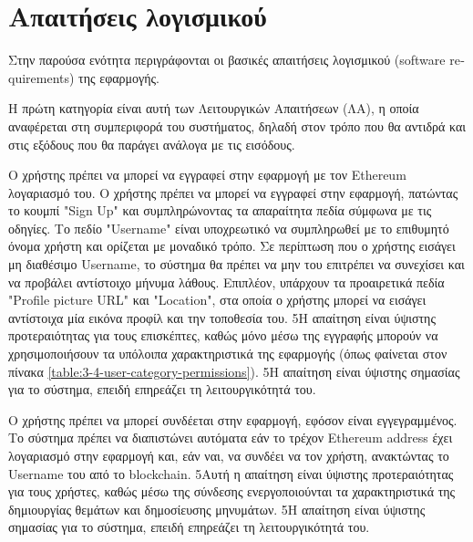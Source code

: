 \section{Απαιτήσεις λογισμικού} \label{section:3-5-software-requirements}

Στην παρούσα ενότητα περιγράφονται οι βασικές απαιτήσεις λογισμικού (\textenglish{software requirements}) της εφαρμογής.

Η πρώτη κατηγορία είναι αυτή των Λειτουργικών Απαιτήσεων (ΛΑ), η οποία αναφέρεται στη συμπεριφορά του συστήματος, δηλαδή στον τρόπο που θα αντιδρά και στις εξόδους που θα παράγει ανάλογα με τις εισόδους.

\begin{enumerate}[label=\textbf{<ΛΑ-\arabic*>}, leftmargin=\parindent, align=left, labelwidth=\parindent, labelsep=0pt]
	\sysReqItem
		{\label{srs:functional-srs-sign-up}}
		{Ο χρήστης πρέπει να μπορεί να εγγραφεί στην εφαρμογή με τον Ethereum λογαριασμό του.}
		{Ο χρήστης πρέπει να μπορεί να εγγραφεί στην εφαρμογή, πατώντας το κουμπί "Sign Up" και συμπληρώνοντας τα απαραίτητα πεδία σύμφωνα με τις οδηγίες. Το πεδίο "Username" είναι υποχρεωτικό να συμπληρωθεί με το επιθυμητό όνομα χρήστη και ορίζεται με μοναδικό τρόπο. Σε περίπτωση που ο χρήστης εισάγει μη διαθέσιμο Username, το σύστημα θα πρέπει να μην του επιτρέπει να συνεχίσει και να προβάλει αντίστοιχο μήνυμα λάθους. Επιπλέον, υπάρχουν τα προαιρετικά πεδία "Profile picture URL" και "Location", στα οποία ο χρήστης μπορεί να εισάγει αντίστοιχα μία εικόνα προφίλ και την τοποθεσία του.}
		{5}{Η απαίτηση είναι ύψιστης προτεραιότητας για τους επισκέπτες, καθώς μόνο μέσω της εγγραφής μπορούν να χρησιμοποιήσουν τα υπόλοιπα χαρακτηριστικά της εφαρμογής (όπως φαίνεται στον πίνακα \ref{table:3-4-user-category-permissions}).}
		{5}{Η απαίτηση είναι ύψιστης σημασίας για το σύστημα, επειδή επηρεάζει τη λειτουργικότητά του.}

	\sysReqItem
		{\label{srs:functional-srs-sign-in}}
		{Ο χρήστης πρέπει να μπορεί συνδέεται στην εφαρμογή, εφόσον είναι εγγεγραμμένος.}
		{Το σύστημα πρέπει να διαπιστώνει αυτόματα εάν το τρέχον Ethereum address έχει λογαριασμό στην εφαρμογή και, εάν ναι, να συνδέει να τον χρήστη, ανακτώντας το Username του από το blockchain.}
		{5}{Αυτή η απαίτηση είναι ύψιστης προτεραιότητας για τους χρήστες, καθώς μέσω της σύνδεσης ενεργοποιούνται τα χαρακτηριστικά της δημιουργίας θεμάτων και δημοσίευσης μηνυμάτων.}
		{5}{Η απαίτηση είναι ύψιστης σημασίας για το σύστημα, επειδή επηρεάζει τη λειτουργικότητά του.}


\end{enumerate}
